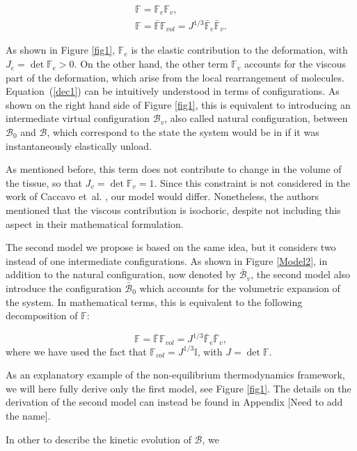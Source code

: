 \documentclass[runningheads]{llncs}
\newcommand{\F}{\ensuremath{\mathbb{F}}}
\begin{document}
\begin{gather}
\F=\F_e\F_v,\label{dec1}\tag{A}\\
\F= \bar{\F} \F_{vol}= J^{1/3} \bar{\F}_e \bar{\F}_v.\tag{B}
\end{gather}

As shown in Figure \ref{fig1}, $\F_e$ is the elastic contribution to the deformation, with $J_e=\det \F_e>0$. On the other hand, the other term $\F_v$ accounts for the viscous part of the deformation, which arise from the local rearrangement of molecules. Equation~(\ref{dec1}) can be intuitively understood in terms of configurations. As shown on the right hand side of Figure \ref{fig1}, this is equivalent to introducing an intermediate virtual configuration $\mathcal{B}_v$, also called natural configuration, between $\mathcal{B}_0$ and $\mathcal{B}$, which correspond to the state the system would be in if it was instantaneously elastically unload. 

As mentioned before, this term does not contribute to change in the volume of the tissue, so that $J_v=\det \F_v= 1$. Since this constraint is not considered in the work of Caccavo et~al. \cite{Article1,CACCAVO2}, our model would differ. Nonetheless, the authors mentioned that the viscous contribution is isochoric, despite not including this aspect in their mathematical formulation. 

The second model we propose is based on the same idea, but it considers two instead of one intermediate configurations. As shown in Figure \ref{Model2}, in addition to the natural configuration, now denoted by $\bar{\mathcal{B}}_v$, the second model also introduce the configuration $\bar{\mathcal{B}}_0$ which accounts for the volumetric expansion of the system. In mathematical terms, this is equivalent to the following decomposition of $\F$:

\begin{equation}
\F= \bar{\F} \F_{vol}= J^{1/3} \bar{\F}_e \bar{\F}_v,
\end{equation}
where we have used the fact that $\F_{vol}=J^{1/3}\mathbb{I}$, with $J=\det \F$. 


As an explanatory example of the non-equilibrium thermodynamics framework, we will here fully derive only the first model, see Figure \ref{fig1}. The details on the derivation of the second model can instead be found in Appendix [Need to add the name]. 

In other to describe the kinetic evolution of $\mathcal{B}$, we 
 
\end{document}
